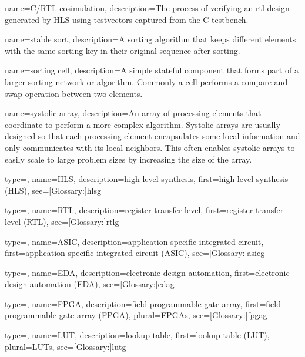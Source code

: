 {
	name={C/RTL cosimulation},
	description={The process of verifying an \gls{rtl} design generated by HLS using testvectors captured from the C testbench.}
}

{
	name={stable sort},
	description={A sorting algorithm that keeps different elements with the same sorting key in their original sequence after sorting.}
}

{
	name={sorting cell},
	description={A simple stateful component that forms part of a larger sorting network or algorithm.  Commonly a cell performs a compare-and-swap operation between two elements.}
}

{
	name={systolic array},
	description={An array of processing elements that coordinate to perform a more complex algorithm.  Systolic arrays are usually designed so that each processing element encapsulates some local information and only communicates with its local neighbors.  This often enables systolic arrays to easily scale to large problem sizes by increasing the size of the array.}
}



{
	type=\acronymtype, 
	name={HLS}, 
	description={high-level synthesis}, 
	first={high-level synthesis (HLS)}, 
	see=[Glossary:]{hlsg}
}

{
	type=\acronymtype, 
	name={RTL}, 
	description={register-transfer level}, 
	first={register-transfer level (RTL)}, 
	see=[Glossary:]{rtlg}
}

{
	type=\acronymtype, 
	name={ASIC}, 
	description={application-specific integrated circuit}, 
	first={application-specific integrated circuit (ASIC)}, 
	see=[Glossary:]{asicg}
}

{
	type=\acronymtype, 
	name={EDA}, 
	description={electronic design automation}, 
	first={electronic design automation (EDA)}, 
	see=[Glossary:]{edag}
}

{
	type=\acronymtype, 
	name={FPGA}, 
	description={field-programmable gate array}, 
	first={field-programmable gate array (FPGA)}, 
	plural={FPGAs},
	see=[Glossary:]{fpgag}
}

{
	type=\acronymtype, 
	name={LUT}, 
	description={lookup table}, 
	first={lookup table (LUT)}, 
	plural={LUTs},
	see=[Glossary:]{lutg}
}

